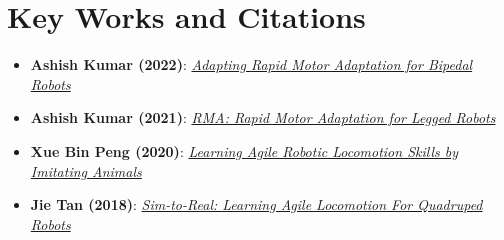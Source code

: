 \section{Key Works and Citations}
\begin{itemize}
	\item \textbf{Ashish Kumar (2022)}: \href{https://arxiv.org/pdf/2205.15299}{\textit{Adapting Rapid Motor Adaptation for Bipedal Robots}}
	\item \textbf{Ashish Kumar (2021)}: \href{https://arxiv.org/pdf/2107.04034}{\textit{RMA: Rapid Motor Adaptation for Legged Robots}}
	\item \textbf{Xue Bin Peng (2020)}: \href{https://arxiv.org/pdf/2004.00784}{\textit{Learning Agile Robotic Locomotion Skills by Imitating Animals}}
	\item \textbf{Jie Tan (2018)}: \href{https://arxiv.org/pdf/1804.10332}{\textit{Sim-to-Real: Learning Agile Locomotion For Quadruped Robots}}
\end{itemize}
